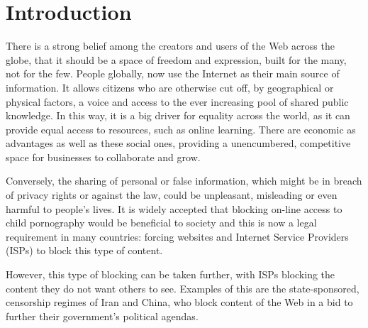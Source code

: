 \documentclass[ %
                    author={Samuel Russell},
                supervisor={Prof. Bogdan Warinschi},
                    degree={MEng},
                     title={Innocuous Ciphertexts},
                  subtitle={The DE-CENSOR Scheme},
                      type={Research},
                      year={2018} ]{dissertation}
\begin{document}

%

\mainmatter


\chapter{Introduction}
\label{chap:intro}

There is a strong belief among the creators and users of the Web across the globe, that it should be a space of freedom and expression, built for the many, not for the few.
People globally, now use the Internet as their main source of information.
It allows citizens who are otherwise cut off, by geographical or physical factors, a voice and access to the ever increasing pool of shared public knowledge.
In this way, it is a big driver for equality across the world, as it can provide equal access to resources, such as online learning.
There are economic as advantages as well as these social ones, providing a unencumbered, competitive space for businesses to collaborate and grow.

Conversely, the sharing of personal or false information, which might be in breach of privacy rights or against the law, could be unpleasant, misleading or even harmful to people’s lives.
It is widely accepted that blocking on-line access to child pornography would be beneficial to society and this is now a legal requirement in many countries: forcing websites and Internet Service Providers (ISPs) to block this type of content.

However, this type of blocking can be taken further, with ISPs blocking the content they do not want others to see. Examples of this are the state-sponsored, censorship regimes of Iran and China, who block content of the Web in a bid to further their government's political agendas.
\end{document}
